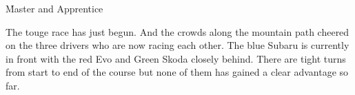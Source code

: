 \h{Master and Apprentice}

The touge race has just begun. And the crowds along the mountain path cheered on the three drivers who are now racing each other. The blue Subaru is currently in front with the red Evo and Green Skoda closely behind. There are tight turns from start to end of the course but none of them has gained a clear advantage so far.